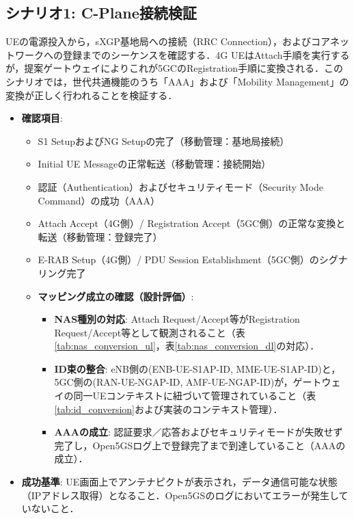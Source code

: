 \subsection{シナリオ1: C-Plane接続検証}
UEの電源投入から，sXGP基地局への接続（RRC Connection），およびコアネットワークへの登録までのシーケンスを確認する．4G UEはAttach手順を実行するが，提案ゲートウェイによりこれが5GCのRegistration手順に変換される．このシナリオでは，世代共通機能のうち「AAA」および「Mobility Management」の変換が正しく行われることを検証する．
\begin{itemize}
    \item \textbf{確認項目}:
    \begin{itemize}
        \item S1 SetupおよびNG Setupの完了（移動管理：基地局接続）
        \item Initial UE Messageの正常転送（移動管理：接続開始）
        \item 認証（Authentication）およびセキュリティモード（Security Mode Command）の成功（AAA）
        \item Attach Accept（4G側）/ Registration Accept（5GC側）の正常な変換と転送（移動管理：登録完了）
        \item E-RAB Setup（4G側）/ PDU Session Establishment（5GC側）のシグナリング完了
        \item \textbf{マッピング成立の確認（設計評価）}:
        \begin{itemize}
            \item \textbf{NAS種別の対応}: Attach Request/\allowbreak Accept等がRegistration Request/\allowbreak Accept等として観測されること（表\ref{tab:nas_conversion_ul}，表\ref{tab:nas_conversion_dl}の対応）．
            \item \textbf{ID束の整合}: eNB側の(ENB-UE-S1AP-ID, MME-UE-S1AP-ID)と，5GC側の(RAN-UE-NGAP-ID, AMF-UE-NGAP-ID)が，ゲートウェイの同一UEコンテキストに紐づいて管理されていること（表\ref{tab:id_conversion}および実装のコンテキスト管理）．
            \item \textbf{AAAの成立}: 認証要求／応答およびセキュリティモードが失敗せず完了し，Open5GSログ上で登録完了まで到達していること（AAAの成立）．
        \end{itemize}
    \end{itemize}
    \item \textbf{成功基準}: UE画面上でアンテナピクトが表示され，データ通信可能な状態（IPアドレス取得）となること．Open5GSのログにおいてエラーが発生していないこと．
\end{itemize}

